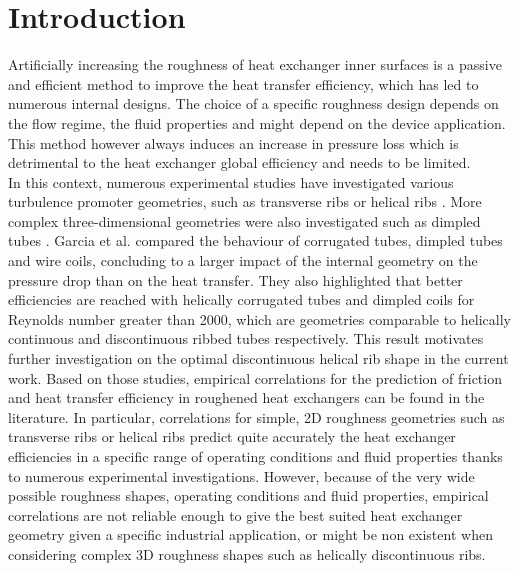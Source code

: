 \section{Introduction}

Artificially increasing the roughness of heat exchanger inner surfaces is a passive and efficient method to improve the heat transfer efficiency, which has led to numerous internal designs. The choice of a specific roughness design depends on the flow regime, the fluid properties and might depend on the device application. This method however always induces an increase in pressure loss which is detrimental to the heat exchanger global efficiency and needs to be limited.\\

In this context, numerous experimental studies have investigated various turbulence promoter geometries, such as transverse ribs \cite{webb1971, aliaga1994} or helical ribs \cite{gee1980, VicenteGarciaViedma2004, cheng2006, Mayo2016}. More complex three-dimensional geometries were also investigated such as dimpled tubes \cite{VicenteGarciaViedma2002}. Garcia et al. \cite{GarciaSolanoVicenteEtAl2012} compared the behaviour of corrugated tubes, dimpled tubes and wire coils, concluding to a larger impact of the internal geometry on the pressure drop than on the heat transfer. They also highlighted that better efficiencies are reached with helically corrugated tubes and dimpled coils for Reynolds number greater than 2000, which are geometries comparable to helically continuous and discontinuous ribbed tubes respectively. This result motivates further investigation on the optimal discontinuous helical rib shape in the current work. Based on those studies, empirical correlations for the prediction of friction and heat transfer efficiency in roughened heat exchangers can be found in the literature. In particular, correlations for simple, 2D roughness geometries such as transverse ribs or helical ribs predict quite accurately the heat exchanger efficiencies in a specific range of operating conditions and fluid properties thanks to numerous experimental investigations. However, because of the very wide possible roughness shapes, operating conditions and fluid properties, empirical correlations are not reliable enough to give the best suited heat exchanger geometry given a specific industrial application, or might be non existent when considering complex 3D roughness shapes such as helically discontinuous ribs.\\

